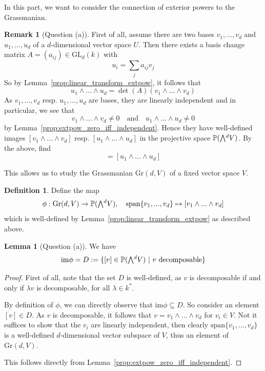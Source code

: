 \documentclass{scrartcl}
\newcommand{\Proj}{\mathbb{P}}
\newcommand{\GL}{\mathrm{GL}}
\newcommand{\Gr}{\mathrm{Gr}}
\newcommand{\extpow}{\mathchoice{{\textstyle\bigwedge}}
    {{\bigwedge}}
    {{\textstyle\wedge}}
    {{\scriptstyle\wedge}}}
\newcommand{\vspan}{\mathrm{span}}
\theoremstyle{definition}
\newtheorem{definition}[subsection]{Definition}
\newtheorem{remark}[subsection]{Remark}
\newtheorem{lemma}[subsection]{Lemma}
\begin{document}
In this part, we want to consider the connection of exterior powers to the Grassmanian.
\begin{remark}[Question (a)]
    First of all, assume there are two bases $v_1, ..., v_d$ and $u_1, ..., u_d$ of a $d$-dimensional vector space $U$. 
    Then there exists a basis change matrix $A = (a_{ij}) \in \GL_d(k)$ with
    \begin{equation*}
        u_i = \sum_j a_{ij} v_j
    \end{equation*}
    So by Lemma~\ref{prop:linear_transform_extpow}, it follows that
    \begin{equation*}
        u_1 \wedge ... \wedge u_d = \det(A) (v_1 \wedge ... \wedge v_d)
    \end{equation*}
    As $v_1, ..., v_d$ resp. $u_1, ..., u_d$ are bases, they are linearly independent and in particular, we see that
    \begin{equation*}
        v_1 \wedge ... \wedge v_d \neq 0 \quad \text{and} \quad u_1 \wedge ... \wedge u_d \neq 0
    \end{equation*}
    by Lemma~\ref{prop:extpow_zero_iff_independent}.
    Hence they have well-defined images $[v_1 \wedge ... \wedge v_d]$ resp. $[u_1 \wedge ... \wedge u_d]$ in the projective space $\Proj(\extpow^d V)$.
    By the above, find
    \begin{equation*}
        [v_1 \wedge ... \wedge v_d] = [u_1 \wedge ... \wedge u_d]
    \end{equation*}
\end{remark}
This allows us to study the Grassmanian $\Gr(d, V)$ of a fixed vector space $V$.
\begin{definition}
    Define the map
    \begin{equation*}
        \phi: \Gr(d, V) \to \Proj(\extpow^d V), \quad \vspan\{v_1, ..., v_d\} \mapsto [v_1 \wedge ... \wedge v_d]
    \end{equation*}
    which is well-defined by Lemma~\ref{prop:linear_transform_extpow} as described above.
\end{definition}
\begin{lemma}[Question (a)]
    We have
    \begin{equation*}
        \mathrm{im}\phi = D := \{ [v] \in \Proj(\extpow^d V) \ | \ \text{$v$ decomposable}\}
    \end{equation*}
\end{lemma}
\begin{proof}
    First of all, note that the set $D$ is well-defined, as $v$ is decomposable if and only if $\lambda v$ is decomposable, for all $\lambda \in k^*$.

    By definition of $\phi$, we can directly observe that $\mathrm{im}\phi \subseteq D$.
    So consider an element $[v] \in D$.
    As $v$ is decomposable, it follows that $v = v_1 \wedge ... \wedge v_d$ for $v_i \in V$.
    Not it suffices to show that the $v_i$ are linearly independent, then clearly $\vspan\{v_1, ..., v_d\}$ is a well-defined $d$-dimensional vector subspace of $V$, thus an element of $\Gr(d, V)$.

    This follows directly from Lemma~\ref{prop:extpow_zero_iff_independent}.
\end{proof}
\end{document}
